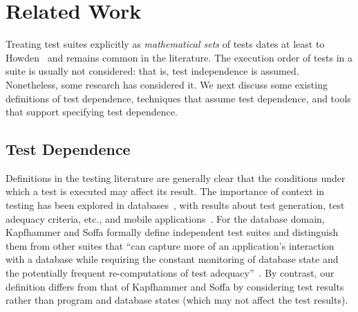 \section{Related Work}
\label{sec:related}

\enlargethispage{5pt}


Treating test suites explicitly as \emph{mathematical sets} of tests dates at least
to Howden~\cite[p.~554]{howden:ToC:1975} and remains common in the literature.
The execution order of tests in a suite is usually not considered:
that is, test independence is assumed. Nonetheless,
some research has considered it. We next discuss some
existing definitions of test dependence, techniques that
assume test dependence, and tools that support specifying
test dependence.

\subsection{Test Dependence}

Definitions in the testing literature are generally clear that the
conditions under which a test is executed may affect its result. 
The
importance of context in testing has been explored 
in databases~\cite{Gray:1994:QGB:191843.191886,Chays:2000:FTD:347324.348954,
kapfhammeretal:FSE:2003}, with results about test
generation, test adequacy criteria, etc., and mobile
applications~\cite{Wang:2007:AGC}.
For the database domain, Kapfhammer and Soffa formally
define independent test suites and distinguish them from
other suites that ``can capture more of an application's
interaction with a database while requiring the constant monitoring of
database state and the potentially frequent re-computations of test
adequacy''~\cite[p.~101]{kapfhammeretal:FSE:2003}.
By contrast, our definition differs from that of Kapfhammer
and Soffa by considering
test results rather than program and database states
(which may not affect the test results).

